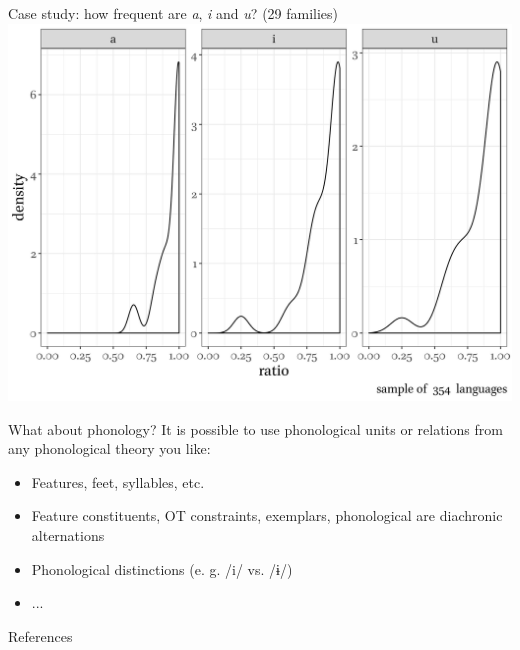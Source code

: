 \documentclass[13pt, t]{beamer}
\begin{document}
\begin{frame}{Case study: how frequent are \textit{a}, \textit{i} and \textit{u}? (29 families)}
\includegraphics[width = \linewidth]{images/08_distributions}
\end{frame}

\begin{frame}{What about phonology?}
It is possible to use phonological units or relations from any phonological theory you like:
\begin{itemize}
\item Features, feet, syllables, etc.
\item Feature constituents, OT constraints, exemplars, phonological are diachronic alternations
\item Phonological distinctions (e. g. /i/ vs. /ɨ/)
\item ...
\end{itemize}
\end{frame}



\begin{frame}{References}
\footnotesize


\end{frame}
\end{document}
